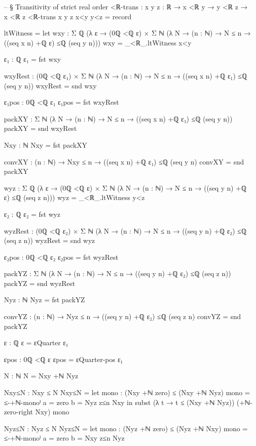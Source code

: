 \documentclass[11pt,a4paper]{book}
\begin{document}
\begin{code}
-- § Transitivity of strict real order
<ℝ-trans : {x y z : ℝ} → x <ℝ y → y <ℝ z → x <ℝ z
<ℝ-trans {x} {y} {z} x<y y<z = record
  { ltWitness =
      let
        wxy : Σ ℚ (λ ε → (0ℚ <ℚ ε) × Σ ℕ (λ N → (n : ℕ) → N ≤ n → ((seq x n) +ℚ ε) ≤ℚ (seq y n)))
        wxy = _<ℝ_.ltWitness x<y

        ε₁ : ℚ
        ε₁ = fst wxy

        wxyRest : (0ℚ <ℚ ε₁) × Σ ℕ (λ N → (n : ℕ) → N ≤ n → ((seq x n) +ℚ ε₁) ≤ℚ (seq y n))
        wxyRest = snd wxy

        ε₁pos : 0ℚ <ℚ ε₁
        ε₁pos = fst wxyRest

        packXY : Σ ℕ (λ N → (n : ℕ) → N ≤ n → ((seq x n) +ℚ ε₁) ≤ℚ (seq y n))
        packXY = snd wxyRest

        Nxy : ℕ
        Nxy = fst packXY

        convXY : (n : ℕ) → Nxy ≤ n → ((seq x n) +ℚ ε₁) ≤ℚ (seq y n)
        convXY = snd packXY

        wyz : Σ ℚ (λ ε → (0ℚ <ℚ ε) × Σ ℕ (λ N → (n : ℕ) → N ≤ n → ((seq y n) +ℚ ε) ≤ℚ (seq z n)))
        wyz = _<ℝ_.ltWitness y<z

        ε₂ : ℚ
        ε₂ = fst wyz

        wyzRest : (0ℚ <ℚ ε₂) × Σ ℕ (λ N → (n : ℕ) → N ≤ n → ((seq y n) +ℚ ε₂) ≤ℚ (seq z n))
        wyzRest = snd wyz

        ε₂pos : 0ℚ <ℚ ε₂
        ε₂pos = fst wyzRest

        packYZ : Σ ℕ (λ N → (n : ℕ) → N ≤ n → ((seq y n) +ℚ ε₂) ≤ℚ (seq z n))
        packYZ = snd wyzRest

        Nyz : ℕ
        Nyz = fst packYZ

        convYZ : (n : ℕ) → Nyz ≤ n → ((seq y n) +ℚ ε₂) ≤ℚ (seq z n)
        convYZ = snd packYZ

        ε : ℚ
        ε = εQuarter ε₁

        εpos : 0ℚ <ℚ ε
        εpos = εQuarter-pos ε₁

        N : ℕ
        N = Nxy +ℕ Nyz

        Nxy≤N : Nxy ≤ N
        Nxy≤N =
          let
            mono : (Nxy +ℕ zero) ≤ (Nxy +ℕ Nyz)
            mono = ≤-+ℕ-monoˡ {a = zero} {b = Nyz} z≤n Nxy
          in
          subst (λ t → t ≤ (Nxy +ℕ Nyz)) (+ℕ-zero-right Nxy) mono

        Nyz≤N : Nyz ≤ N
        Nyz≤N =
          let
            mono : (Nyz +ℕ zero) ≤ (Nyz +ℕ Nxy)
            mono = ≤-+ℕ-monoˡ {a = zero} {b = Nxy} z≤n Nyz

}
\end{code}
\end{document}
